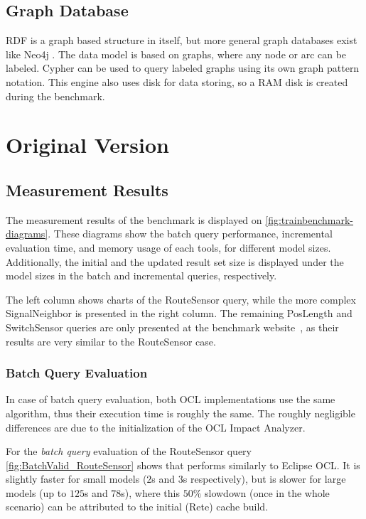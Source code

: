 \subsection{Graph Database}
RDF is a graph based structure in itself, but more general graph databases exist like Neo4j \cite{neo4j}. The data model is based on graphs, where any node or arc can be labeled. Cypher can be used to query labeled graphs using its own graph pattern notation. This engine also uses disk for data storing, so a RAM disk is created during the benchmark.

\section{Original Version}


\subsection{Measurement Results}
\label{sec:results}

The measurement results of the benchmark is displayed on
\autoref{fig:trainbenchmark-diagrams}. These diagrams show the batch query
performance, incremental evaluation time, and memory usage of each tools, for
different model sizes. Additionally, the initial and the updated result set size
is displayed under the model sizes in the batch and incremental queries,
respectively.

The left column shows charts of the \textsf{RouteSensor} query,
while the more complex \textsf{SignalNeighbor} is presented in the right column.
The remaining \textsf{PosLength} and \textsf{SwitchSensor} queries are only presented
at the benchmark website~\cite{TBwebsite}, as their results are very similar to the
\textsf{RouteSensor} case.

\subsubsection{Batch Query Evaluation}
In case of batch query evaluation, both OCL implementations use the same
algorithm, thus their execution time is roughly the same. The roughly negligible
differences are due to the initialization of the OCL Impact Analyzer.

For the \emph{batch query} evaluation of the \textsf{RouteSensor} query
\autoref{fig:BatchValid_RouteSensor} shows that \incquery{} performs similarly
to Eclipse OCL. It is slightly faster for small models ($2$s and $3$s
respectively), but is slower for large models (up to $125$s and $78$s), where
this $50\%$ slowdown (once in the whole scenario) can be attributed to the
initial (Rete) cache build.

